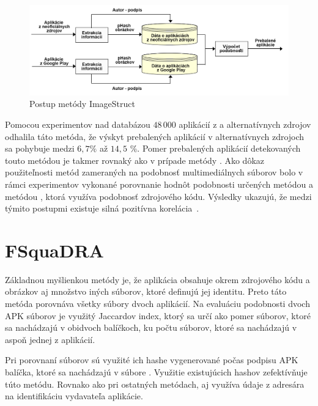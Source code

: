 \begin{figure}[htb]
  \begin{center}
    \includegraphics[width=130mm]{images/ImageStruct.png}
  \end{center}
  \caption{Postup metódy ImageStruct}
  \label{fig:strukturaImageStruct}
\end{figure}

Pomocou experimentov nad databázou $48\,000$ aplikácií z  a alternatívnych zdrojov odhalila táto metóda, že výskyt prebalených aplikácií v alternatívnych zdrojoch sa pohybuje medzi $6,7 \%$ až $14,5$ \%.
Pomer prebalených aplikácií detekovaných touto metódou je takmer rovnaký ako v prípade metódy . Ako dôkaz použiteľnosti metód zameraných na podobnosť multimediálnych súborov bolo v rámci experimentov vykonané porovnanie hodnôt podobnosti určených metódou  a metódou , ktorá využíva podobnosť zdrojového kódu. Výsledky ukazujú, že medzi týmito postupmi existuje silná pozitívna korelácia~\cite{ImageStruct}. 


\section{FSquaDRA}
Základnou myšlienkou metódy  je, že aplikácia obsahuje okrem zdrojového kódu a obrázkov aj množstvo iných súborov, ktoré definujú jej identitu. Preto táto metóda porovnáva všetky súbory dvoch aplikácií. Na evaluáciu podobnosti dvoch APK súborov je využitý Jaccardov index, ktorý sa určí ako pomer súborov, ktoré sa nachádzajú v obidvoch balíčkoch, ku počtu súborov, ktoré sa nachádzajú v aspoň jednej z aplikácií.

Pri porovnaní súborov sú využité ich hashe vygenerované počas podpisu APK balíčka, ktoré sa nachádzajú v súbore . Využitie existujúcich hashov zefektívňuje túto metódu.
Rovnako ako pri ostatných metódach, aj  využíva údaje z adresára  na identifikáciu vydavateľa aplikácie. 

